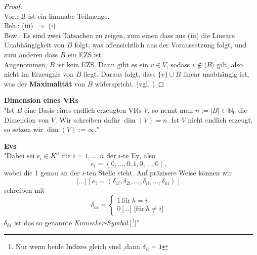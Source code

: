 \begin{proof}
\\ Vor.: B ist ein  \acl{linunab}e Teilmenge.
\\ Beh.: (iii) $\Rightarrow$ (i) 
\\ Bew.: Es sind zwei Tatsachen zu zeigen, zum einen dass aus (iii) die Lineare Unabhängigkeit von $B$ folgt, was offensichtlich aus der Voraussetzung folgt, und zum anderen dass $B$ ein \acl{EZS} ist. 
\\ Angenommen, $B$ ist kein \acl{EZS}. Dann gibt es ein $v \in V$, sodass $v \notin \langle B \rangle$ gilt, also nicht im Erzeugnis von $B$ liegt. Daraus folgt, dass $\{v\} \cup B$ linear unabhängig ist, was der \textbf{Maximalität} von $B$ widerspricht. (vgl. \cite[S. 59]{Beutel}) 
\end{proof}

\theoremstyle{definition}
\begin{definition}{\textbf{Dimension eines \acl{VR}s}}
\label{def:dim}
	\\"Ist $B$ eine Basis eines endlich erzeugten \acl{VR}s $V$, so nennt man $n := |B| \in \mathbb{N}_0$ die Dimension von $V$. Wir schreiben dafür $\dim(V)= n$. Ist $V$ nicht endlich erzeugt, so setzen wir $\dim(V):= \infty$." \cite[S. 504]{Enzy}
\end{definition}

\theoremstyle{definition}
	\label{def:Ev}
	\begin{definition}{\textbf{\aclp{Ev}}}
	\\"Dabei sei $e_i \in K^n$ für $i = 1,...,n$ der $i$-te \acl{Ev}, also 
	\[e_i = (0,...,0,1,0,...,0)\text{,}\]
	wobei die 1 genau an der $i$-ten Stelle steht. Auf präzisere Weise können wir
	\[\text{[...]} \, [e_i = (\delta_{1i},\delta_{2i},...,\delta_{ii},...,\delta_{ni})]\]%
	schreiben mit 
	\[\delta_{hi}= \begin{cases} 1 \, \text{für} \: h = i \\ 0 \: \text{[...] [für} \, h\not=i] \end{cases}\]
	$\delta_{hi}$ ist das so genannte \emph{Kronecker-Symbol}.[\footnote{Nur wenn beide Indizes gleich sind ,dann $\delta_{ii}=1$}]" \cite[S. 31]{Bosch}
	\end{definition} 

